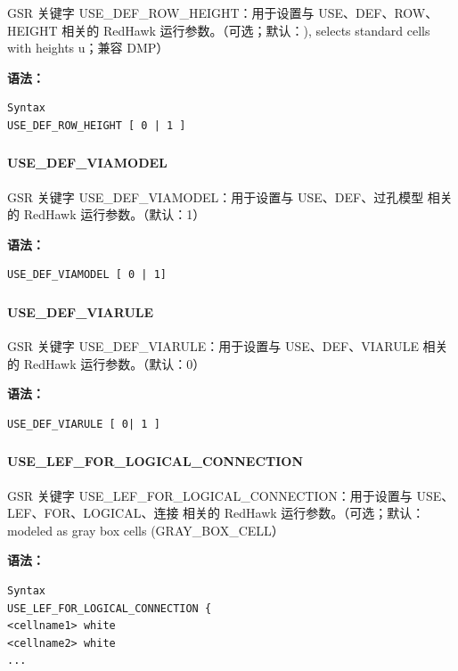 GSR 关键字 USE_DEF_ROW_HEIGHT：用于设置与 USE、DEF、ROW、HEIGHT 相关的 RedHawk 运行参数。（可选；默认：), selects standard cells with heights u；兼容 DMP）

\textbf{语法：}
\begin{lstlisting}
Syntax
USE_DEF_ROW_HEIGHT [ 0 | 1 ]
\end{lstlisting}

\subsubsection{}
\paragraph*{USE_DEF_VIAMODEL}

GSR 关键字 USE_DEF_VIAMODEL：用于设置与 USE、DEF、过孔模型 相关的 RedHawk 运行参数。（默认：1）

\textbf{语法：}
\begin{lstlisting}
USE_DEF_VIAMODEL [ 0 | 1]
\end{lstlisting}

\subsubsection{}
\paragraph*{USE_DEF_VIARULE}

GSR 关键字 USE_DEF_VIARULE：用于设置与 USE、DEF、VIARULE 相关的 RedHawk 运行参数。（默认：0）

\textbf{语法：}
\begin{lstlisting}
USE_DEF_VIARULE [ 0| 1 ]
\end{lstlisting}

\subsubsection{}
\paragraph*{USE_LEF_FOR_LOGICAL_CONNECTION}

GSR 关键字 USE_LEF_FOR_LOGICAL_CONNECTION：用于设置与 USE、LEF、FOR、LOGICAL、连接 相关的 RedHawk 运行参数。（可选；默认：modeled as gray box cells (GRAY_BOX_CELL）

\textbf{语法：}
\begin{lstlisting}
Syntax
USE_LEF_FOR_LOGICAL_CONNECTION {
<cellname1> white
<cellname2> white
...
\end{lstlisting}

